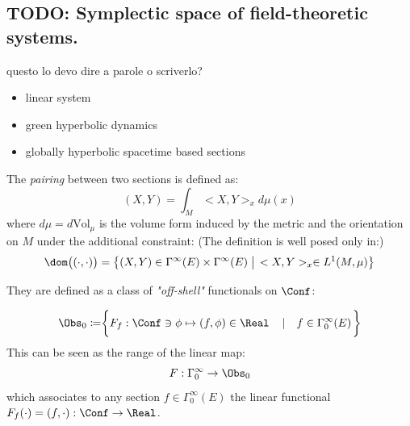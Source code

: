 \documentclass[a4paper,10pt]{report}
\begin{document}
	
	\subsection{TODO: Symplectic space of field-theoretic systems.}
	\begin{remark}
	questo lo devo dire  a parole o scriverlo?
	\begin{itemize}
		\item linear system
		\item green hyperbolic dynamics
		\item globally hyperbolic spacetime based sections
	\end{itemize}
	\end{remark}
	
	\begin{definition}
		The \emph{pairing} between two sections is defined as:
   			\begin{equation}\label{Def:Pairing}
			(X,Y) = \int_M <X,Y>_x d\mu(x)
			\end{equation}
			where $d\mu = d\textrm{Vol}_\mu$ is the volume form induced by the metric and the orientation on $M$
			under the additional constraint:
  				(The definition is well posed only in:)
 			\begin{displaymath}
				\dom\big( (\cdot, \cdot) \big) =
				\big\{(X,Y) \in \Gamma^\infty(E) \times \Gamma^\infty(E) \; \big\vert \,  <X,Y>_x \in L^1(M,\mu)\big \}
			\end{displaymath}
	\end{definition}
	
	\begin{definition}
		They are defined as a class of \emph{"off-shell"} functionals on $\Conf$:
		
		\begin{displaymath}
			\Obs_0 \coloneqq \biggr\{ F_f: \Conf \ni \phi \mapsto ( f, \phi) \in \Real \quad
			\left\vert\quad  f \in \Gamma_0^\infty(E) \right.	\biggr\}
		\end{displaymath}
		This can be seen as the range of the linear map:
		\begin{displaymath}
			F: \Gamma_0^\infty \rightarrow \Obs_0
		\end{displaymath}
		which associates to any section $f\in \Gamma_0^\infty(E)$ the linear functional
		$F_f(\cdot) = (f,\cdot) :\Conf \rightarrow \Real$.\\
	\end{definition}
	
\end{document}
